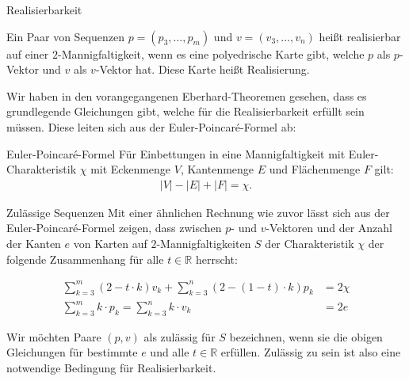 \documentclass[10pt, notheorems]{beamer}
\newcommand{\reals}{\mathbb{R}}
\newcommand{\hdef}[1]{\textcolor{darkred2}{#1}}
\begin{document}
\begin{frame}{Realisierbarkeit}
  \begin{definition}
    Ein Paar von Sequenzen $p = (p_3, \dots, p_m)$ und $v = (v_3, \dots, v_n)$ heißt \hdef{realisierbar} auf einer $2$-Mannigfaltigkeit, wenn es eine polyedrische Karte gibt, welche $p$ als $p$-Vektor und $v$ als $v$-Vektor hat. Diese Karte heißt \hdef{Realisierung}.
  \end{definition}
  \pause
  Wir haben in den vorangegangenen {\sc Eberhard}-Theoremen gesehen, dass es grundlegende Gleichungen gibt, welche für die Realisierbarkeit erfüllt sein müssen. Diese leiten sich aus der {\sc Euler}-{\sc Poincaré}-Formel ab:
  \begin{block}{{\sc Euler}-{\sc Poincaré}-Formel}
    Für Einbettungen in eine Mannigfaltigkeit mit {\sc Euler}-Charakteristik $\chi$ mit Eckenmenge $V$, Kantenmenge $E$ und Flächenmenge $F$ gilt:
    \begin{align*}
      |V| - |E| + |F| = \chi.
    \end{align*}
  \end{block}
\end{frame}

\begin{frame}{Zulässige Sequenzen}
  Mit einer ähnlichen Rechnung wie zuvor lässt sich aus der {\sc Euler}-{\sc Poincaré}-Formel zeigen, dass zwischen $p$- und $v$-Vektoren und der Anzahl der Kanten $e$ von Karten auf $2$-Mannigfaltigkeiten $S$ der Charakteristik $\chi$ der folgende Zusammenhang für alle $t \in \reals$ herrscht:
  \begin{block}{}
    \begin{align*}
      \sum_{k=3}^m (2 - t \cdot k ) v_k + \sum_{k=3}^n ( 2 - (1 - t) \cdot k ) p_k &= 2 \chi\\
      \sum_{k=3}^{m} k \cdot p_k = \sum_{k=3}^{n} k \cdot v_k &= 2e
    \end{align*}
  \end{block}
  Wir möchten Paare $(p, v)$ als \hdef{zulässig für $S$} bezeichnen, wenn sie die obigen Gleichungen für bestimmte $e$ und alle $t \in \reals$ erfüllen. Zulässig zu sein ist also eine notwendige Bedingung für Realisierbarkeit.
\end{frame}
\end{document}
